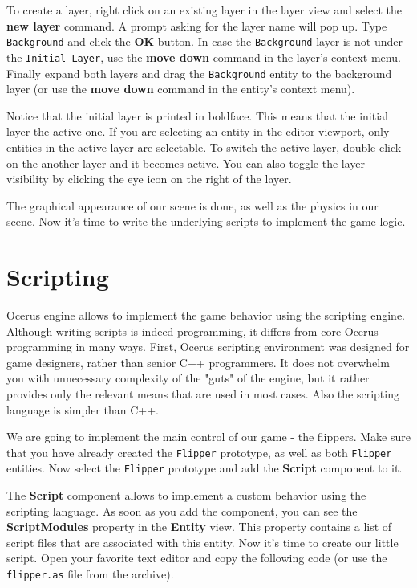 \documentclass[a4paper,12pt]{article}
\begin{document}
To create a layer, right click on an existing layer in the layer view and select the \textbf{new layer} command. A prompt asking for the layer name will pop up. Type \texttt{Background} and click the \textbf{OK} button. In case the \texttt{Background} layer is not under the \texttt{Initial Layer}, use the \textbf{move down} command in the layer's context menu. Finally expand both layers and drag the \texttt{Background} entity to the background layer (or use the \textbf{move down} command in the entity's context menu).

Notice that the initial layer is printed in boldface. This means that the initial layer the active one. If you are selecting an entity in the editor viewport, only entities in the active layer are selectable. To switch the active layer, double click on the another layer and it becomes active. You can also toggle the layer visibility by clicking the eye icon on the right of the layer.

The graphical appearance of our scene is done, as well as the physics in our scene. Now it's time to write the underlying scripts to implement the game logic.

\section{Scripting}
Ocerus engine allows to implement the game behavior using the scripting engine. Although writing scripts is indeed programming, it differs from core Ocerus programming in many ways. First, Ocerus scripting environment was designed for game designers, rather than senior C++ programmers. It does not overwhelm you with unnecessary complexity of the "guts" of the engine, but it rather provides only the relevant means that are used in most cases. Also the scripting language is simpler than C++.

We are going to implement the main control of our game - the flippers. Make sure that you have already created the \texttt{Flipper} prototype, as well as both \texttt{Flipper} entities. Now select the \texttt{Flipper} prototype and add the \textbf{Script} component to it.

The \textbf{Script} component allows to implement a custom behavior using the scripting language. As soon as you add the component, you can see the \textbf{ScriptModules} property in the \textbf{Entity} view. This property contains a list of script files that are associated with this entity. Now it's time to create our little script. Open your favorite text editor and copy the following code (or use the \texttt{flipper.as} file from the archive).
\end{document}
